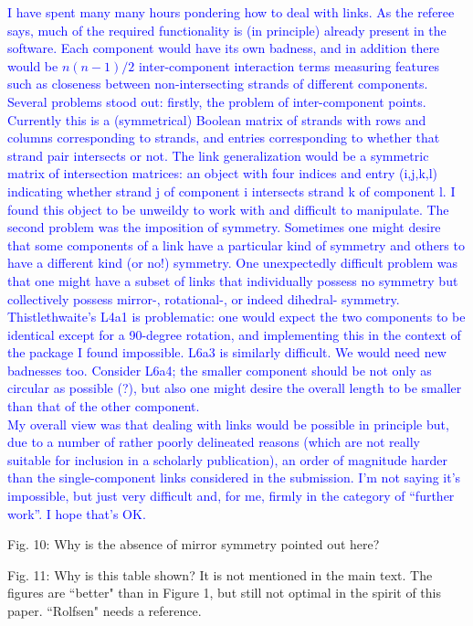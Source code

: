 \documentclass[12pt]{article}
\begin{document}
\textcolor{blue}{I have spent many many hours pondering how to deal
  with links.  As the referee says, much of the required functionality
  is (in principle) already present in the software.  Each component
  would have its own badness, and in addition there would be
  $n(n-1)/2$ inter-component interaction terms measuring features such
  as closeness between non-intersecting strands of different
  components.  Several problems stood out: firstly, the problem of
  inter-component points.  Currently this is a (symmetrical) Boolean
  matrix of strands with rows and columns corresponding to strands,
  and entries corresponding to whether that strand pair intersects or
  not.  The link generalization would be a symmetric matrix of
  intersection matrices: an object with four indices and entry
  (i,j,k,l) indicating whether strand j of component i intersects
  strand k of component l.  I found this object to be unweildy to work
  with and difficult to manipulate.  The second problem was the
  imposition of symmetry.  Sometimes one might desire that some
  components of a link have a particular kind of symmetry and others
  to have a different kind (or no!) symmetry.  One unexpectedly
  difficult problem was that one might have a subset of links that
  individually possess no symmetry but collectively possess mirror-,
  rotational-, or indeed dihedral- symmetry.  Thistlethwaite's L4a1 is
  problematic: one would expect the two components to be identical
  except for a 90-degree rotation, and implementing this in the
  context of the package I found impossible. L6a3 is similarly
  difficult.  We would need new badnesses too.  Consider L6a4; the
  smaller component should be not only as circular as possible (?),
  but also one might desire the overall length to be smaller than that
  of the other component.\\ My overall view was that dealing with
  links would be possible in principle but, due to a number of rather
  poorly delineated reasons (which are not really suitable for
  inclusion in a scholarly publication), an order of magnitude harder
  than the single-component links considered in the submission.  I'm
  not saying it's impossible, but just very difficult and, for me,
  firmly in the category of ``further work''.  I hope that's OK.}

Fig. 10: Why is the absence of mirror symmetry pointed out here?

Fig. 11: Why is this table shown?  It is not mentioned in the main
text.  The figures are ``better" than in Figure 1, but still not
optimal in the spirit of this paper.  ``Rolfsen" needs a reference.
\end{document}
